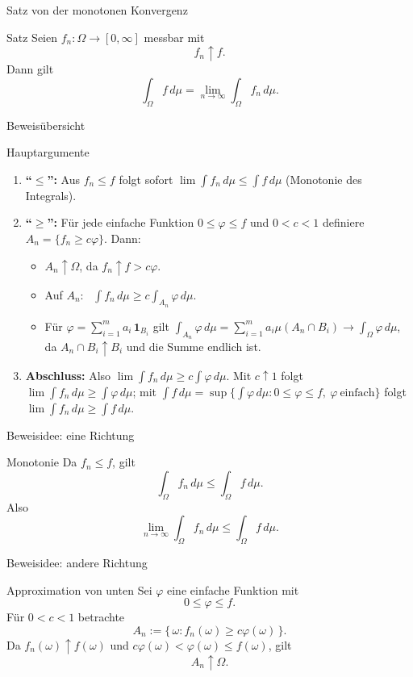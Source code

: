 \documentclass{beamer}
\begin{document}
\begin{frame}{Satz von der monotonen Konvergenz}
\begin{block}{Satz}
Seien \(f_n\colon\Omega\to[0,\infty]\) messbar mit
\[
f_n\uparrow f.
\]
Dann gilt
\[
\int_\Omega f\,d\mu
=
\lim_{n\to\infty}\int_\Omega f_n\,d\mu.
\]
\end{block}
\end{frame}

\begin{frame}{Beweisübersicht}
\begin{block}{Hauptargumente}
\begin{enumerate}
\item \textbf{``\(\le\)'':} Aus \(f_n\le f\) folgt sofort \(\lim\int f_n\,d\mu\le\int f\,d\mu\) (Monotonie des Integrals).
\item \textbf{``\(\ge\)'':} Für jede einfache Funktion \(0\le\varphi\le f\) und \(0<c<1\) definiere \(A_n=\{f_n\ge c\varphi\}\). Dann:
\begin{itemize}
\item \(A_n\uparrow\Omega\), da \(f_n\uparrow f > c\varphi\).
\item Auf \(A_n\): \ \(\int f_n\,d\mu\ge c\int_{A_n}\varphi\,d\mu\).
\item Für \(\varphi=\sum_{i=1}^m a_i\,\mathbf 1_{B_i}\) gilt
\(\int_{A_n}\varphi\,d\mu=\sum_{i=1}^m a_i\mu(A_n\cap B_i)\to\int_\Omega\varphi\,d\mu\),
da \(A_n\cap B_i\uparrow B_i\) und die Summe endlich ist.
\end{itemize}
\item \textbf{Abschluss:} Also \(\lim\int f_n\,d\mu\ge c\int\varphi\,d\mu\). Mit \(c\uparrow 1\) folgt
\(\lim\int f_n\,d\mu\ge\int\varphi\,d\mu\); mit
\(\int f\,d\mu=\sup\{\int\varphi\,d\mu: 0\le\varphi\le f,\ \varphi\ \text{einfach}\}\)
folgt \(\lim\int f_n\,d\mu\ge\int f\,d\mu\).
\end{enumerate}
\end{block}
\end{frame}

\begin{frame}{Beweisidee: eine Richtung}
\begin{block}{Monotonie}
Da \(f_n\le f\), gilt
\[
\int_\Omega f_n\,d\mu\le \int_\Omega f\,d\mu.
\]
Also
\[
\lim_{n\to\infty}\int_\Omega f_n\,d\mu
\le
\int_\Omega f\,d\mu.
\]
\end{block}
\end{frame}

\begin{frame}{Beweisidee: andere Richtung}
\begin{block}{Approximation von unten}
Sei \(\varphi\) eine einfache Funktion mit
\[
0\le \varphi\le f.
\]
Für \(0<c<1\) betrachte
\[
A_n:=\{\,\omega: f_n(\omega)\ge c\varphi(\omega)\,\}.
\]
Da \(f_n(\omega)\uparrow f(\omega)\) und \(c\varphi(\omega)<\varphi(\omega)\le f(\omega)\), gilt
\[
A_n\uparrow\Omega.
\]
\end{block}
\end{frame}
\end{document}
